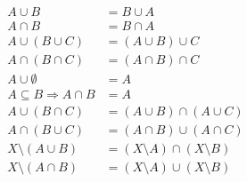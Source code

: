 \documentclass{article}
\theoremstyle{plain}
\theoremstyle{normal}
\begin{document}
        \begin{align}
            A\cup{B}&=B\cup{A}\tag{Commutativity of Unions}\\
            A\cap{B}&=B\cap{A}\tag{Commutativity of Intersections}\\
            A\cup(B\cup{C})&=(A\cup{B})\cup{C}\tag{Associativity of Unions}\\
            A\cap(B\cap{C})&=(A\cap{B})\cap{C}\tag{Associativity of Intersections}\\
            A\cup\emptyset&=A\tag{Identity Law of Unions}\\
            A\subseteq{B}\Rightarrow{A}\cap{B}&=A\tag{Identity Law of Intersections}\\
            A\cup(B\cap{C})&=(A\cup{B})\cap(A\cup{C})\tag{Distributive Law of Unions}\\
            A\cap(B\cup{C})&=(A\cap{B})\cup(A\cap{C})\tag{Distributive Law of Intersections}\\
            X\setminus(A\cup{B})&=(X\setminus{A})\cap(X\setminus{B})\tag{De Morgan's Law of Unions}\\
            X\setminus(A\cap{B})&=(X\setminus{A})\cup(X\setminus{B})\tag{De Morgan's Law of Intersections}
        \end{align}
\end{document}
